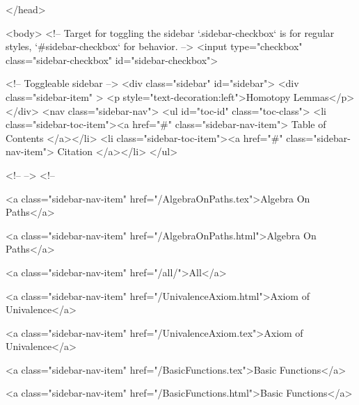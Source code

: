   
</head>




  <body>
    <!-- Target for toggling the sidebar `.sidebar-checkbox` is for regular
     styles, `#sidebar-checkbox` for behavior. -->
<input type="checkbox" class="sidebar-checkbox" id="sidebar-checkbox">

<!-- Toggleable sidebar -->
<div class="sidebar" id="sidebar">
  <div class="sidebar-item" >
    <p style="text-decoration:left">Homotopy Lemmas</p>
  </div>
  <nav class="sidebar-nav">
    <ul id="toc-id" class="toc-class">
  <li class="sidebar-toc-item"><a href="#" class="sidebar-nav-item"> Table of Contents </a></li>
  <li class="sidebar-toc-item"><a href="#" class="sidebar-nav-item"> Citation </a></li>
</ul>


    <!--  -->
    <!-- 
      
    
      
    
      
    
      
        
      
    
      
        
          <a class="sidebar-nav-item" href="/AlgebraOnPaths.tex">Algebra On Paths</a>
        
      
    
      
        
          <a class="sidebar-nav-item" href="/AlgebraOnPaths.html">Algebra On Paths</a>
        
      
    
      
        
          <a class="sidebar-nav-item" href="/all/">All</a>
        
      
    
      
        
          <a class="sidebar-nav-item" href="/UnivalenceAxiom.html">Axiom of Univalence</a>
        
      
    
      
        
          <a class="sidebar-nav-item" href="/UnivalenceAxiom.tex">Axiom of Univalence</a>
        
      
    
      
        
          <a class="sidebar-nav-item" href="/BasicFunctions.tex">Basic Functions</a>
        
      
    
      
        
          <a class="sidebar-nav-item" href="/BasicFunctions.html">Basic Functions</a>
        
